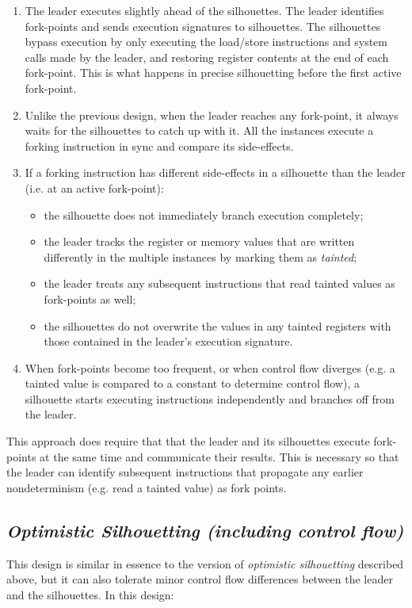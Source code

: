 \begin{enumerate}
\item The leader executes slightly ahead of the silhouettes. 
  The leader identifies fork-points and sends
  execution signatures to silhouettes. 
  The silhouettes bypass execution by only 
  executing the load/store instructions
  and system calls made by the leader,
  and restoring register contents
  at the end of each fork-point.
  This is what happens
  in precise silhouetting before
  the first active fork-point.

\item Unlike the previous design,
  when the leader reaches any fork-point, it always waits
  for the silhouettes to catch up with it.
  All the instances execute a forking instruction
  in sync and compare its side-effects.

\item If a forking 
instruction has different
side-effects in a silhouette
than the leader (i.e. at an
active fork-point): 
\begin{itemize}
  \item the silhouette does not immediately 
  branch execution completely;
  \item the leader tracks the register or 
  memory values that are written differently
  in the multiple instances
  by marking them as {\em tainted};
  \item the leader treats any subsequent instructions that 
  read tainted values as
  fork-points as well;

  \item the silhouettes
  do not overwrite the
  values in any tainted registers
  with those contained in the 
  leader's execution signature.
\end{itemize}

\item When fork-points 
become too frequent, or when
control flow diverges (e.g. a tainted
value is compared to a constant to
determine control flow),
a silhouette starts
executing instructions independently
and branches off from the leader.
\end{enumerate}

\noindent This approach does require that that 
the leader and its silhouettes
execute fork-points at the same time
and communicate their results.
This is necessary so that the leader
can identify subsequent instructions
that propagate any earlier
nondeterminism (e.g. read a tainted
value) as fork points.

\subsection{\em Optimistic Silhouetting (including control flow)}\label{opt:sil}
This design is similar in essence to the version of {\em optimistic silhouetting}  
described above, but it can also tolerate minor control flow
differences between the leader and the silhouettes. 
In this design:

